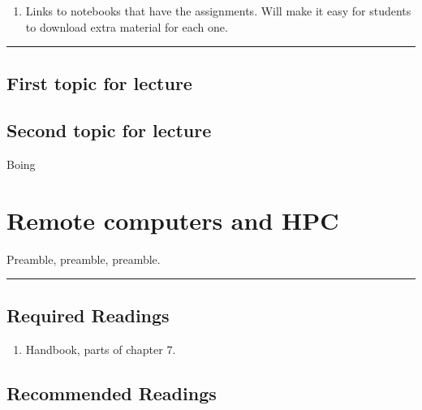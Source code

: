 \documentclass[]{book}
\providecommand{\tightlist}{%
  \setlength{\itemsep}{0pt}\setlength{\parskip}{0pt}}
\begin{document}
\begin{enumerate}
\def\labelenumi{\arabic{enumi}.}
\tightlist
\item
  Links to notebooks that have the assignments. Will make it
  easy for students to download extra material for each one.
\end{enumerate}

\begin{center}\rule{0.5\linewidth}{\linethickness}\end{center}

\hypertarget{first-topic-for-lecture-3}{%
\section{First topic for lecture}\label{first-topic-for-lecture-3}}

\hypertarget{second-topic-for-lecture-3}{%
\section{Second topic for lecture}\label{second-topic-for-lecture-3}}

Boing

\hypertarget{remote-computers-and-hpc}{%
\chapter{Remote computers and HPC}\label{remote-computers-and-hpc}}

Preamble, preamble, preamble.

\begin{center}\rule{0.5\linewidth}{\linethickness}\end{center}

\hypertarget{required-readings-4}{%
\section*{Required Readings}\label{required-readings-4}}

\begin{enumerate}
\def\labelenumi{\arabic{enumi}.}
\tightlist
\item
  Handbook, parts of chapter 7.
\end{enumerate}

\hypertarget{recommended-readings-4}{%
\section*{Recommended Readings}\label{recommended-readings-4}}
\end{document}
